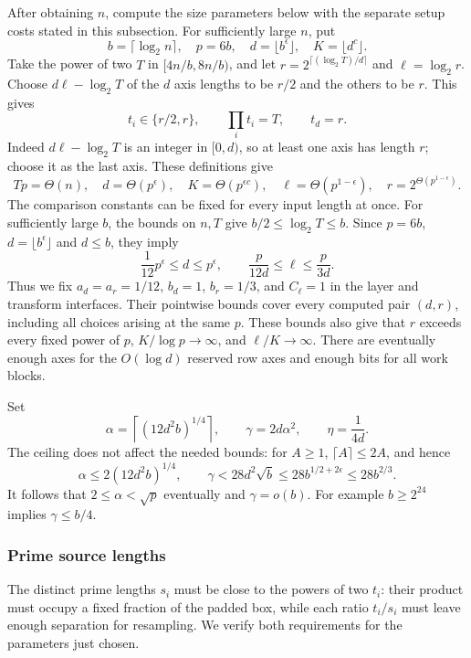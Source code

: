 \documentclass[11pt]{article}
\theoremstyle{definition}
\begin{document}
After obtaining $n$, compute the size parameters below with the
separate setup costs stated in this subsection.  For sufficiently
large $n$, put
\[
 b=\lceil\log_2n\rceil,\quad p=6b,\quad d=\lfloor b^\epsilon\rfloor,
 \quad K=\lfloor d^c\rfloor.
\]
Take the power of two $T$ in $[4n/b,8n/b)$, and let
$r=2^{\lceil(\log_2T)/d\rceil}$ and $\ell=\log_2r$.  Choose
$d\ell-\log_2T$ of the $d$ axis lengths to be $r/2$ and the others to
be $r$.  This gives
\[
 t_i\in\{r/2,r\},\qquad \prod_i t_i=T,\qquad t_d=r.
\]
Indeed $d\ell-\log_2T$ is an integer in $[0,d)$, so at least one axis
has length $r$; choose it as the last axis.
These definitions give
\begin{equation}\label{eq:sizes}
 Tp=\Theta(n),\quad d=\Theta(p^\epsilon),\quad
 K=\Theta(p^{\epsilon c}),\quad
 \ell=\Theta(p^{1-\epsilon}),\quad r=2^{\Theta(p^{1-\epsilon})}.
\end{equation}
The comparison constants can be fixed for every input length at once.
For sufficiently large $b$, the bounds on $n,T$ give
$b/2\leq\log_2T\leq b$. Since $p=6b$, $d=\lfloor b^\epsilon\rfloor$
and $d\leq b$, they imply
\[
 \frac1{12}p^\epsilon\leq d\leq p^\epsilon,
 \qquad \frac{p}{12d}\leq\ell\leq\frac{p}{3d}.
\]
Thus we fix $a_d=a_r=1/12$, $b_d=1$, $b_r=1/3$, and $C_\ell=1$
in the layer and transform interfaces. Their pointwise bounds cover every
computed pair $(d,r)$, including all choices arising at the same $p$.
These bounds also give that $r$ exceeds every fixed power of $p$,
$K/\log p\to\infty$, and
$\ell/K\to\infty$.  There are eventually enough axes for the
$O(\log d)$ reserved row axes and enough bits for all work blocks.

Set
\[
 \alpha=\left\lceil(12d^2b)^{1/4}\right\rceil,
 \qquad \gamma=2d\alpha^2,\qquad \eta=\frac1{4d}.
\]
The ceiling does not affect the needed bounds: for $A\ge1$,
$\lceil A\rceil\le2A$, and hence
\begin{equation}\label{eq:gamma}
 \alpha\le2(12d^2b)^{1/4},\qquad
 \gamma<28d^2\sqrt b\le28b^{1/2+2\epsilon}\le28b^{2/3}.
\end{equation}
It follows that $2\le\alpha<\sqrt p$ eventually and $\gamma=o(b)$.
For example $b\ge2^{24}$ implies $\gamma\le b/4$.

\subsubsection{Prime source lengths}

The distinct prime lengths $s_i$ must be close to the powers of two
$t_i$: their product must occupy a fixed fraction of the padded box,
while each ratio $t_i/s_i$ must leave enough separation for resampling.
We verify both requirements for the parameters just chosen.
\end{document}
